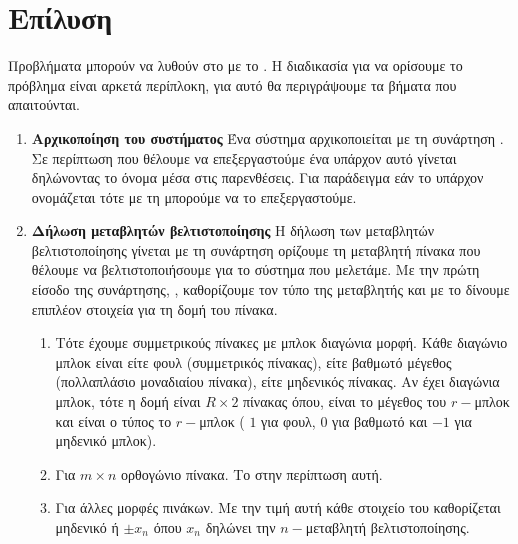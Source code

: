 \section{Επίλυση}
Προβλήματα  μπορούν να λυθούν στο  με το . Η διαδικασία για να ορίσουμε το πρόβλημα είναι αρκετά περίπλοκη, για
αυτό θα περιγράψουμε τα βήματα που απαιτούνται.
\begin{enumerate}
    \item \textbf{Αρχικοποίηση του  συστήματος} Ένα σύστημα 
        αρχικοποιείται με τη συνάρτηση . Σε περίπτωση
        που θέλουμε να επεξεργαστούμε ένα υπάρχον  αυτό γίνεται
        δηλώνοντας το όνομα μέσα στις παρενθέσεις. Για παράδειγμα εάν το υπάρχον
         ονομάζεται  τότε με τη 
        μπορούμε να το επεξεργαστούμε.
    \item \textbf{Δήλωση μεταβλητών βελτιστοποίησης} Η δήλωση των μεταβλητών
        βελτιστοποίησης γίνεται με τη συνάρτηση
         ορίζουμε τη μεταβλητή πίνακα που
        θέλουμε να βελτιστοποιήσουμε για το  σύστημα που μελετάμε. Με
        την πρώτη είσοδο της συνάρτησης, , καθορίζουμε τον
        τύπο της μεταβλητής και με το  δίνουμε επιπλέον
        στοιχεία για τη δομή του πίνακα.
        \begin{enumerate}
            \item \textbf{} Τότε έχουμε
                συμμετρικούς πίνακες με μπλοκ διαγώνια μορφή. Κάθε διαγώνιο μπλοκ είναι
                είτε φουλ (συμμετρικός πίνακας), είτε βαθμωτό μέγεθος (πολλαπλάσιο
                μοναδιαίου πίνακα), είτε μηδενικός πίνακας. Αν  έχει 
                διαγώνια μπλοκ, τότε η δομή  είναι \(R \times 2\) πίνακας
                όπου,  είναι το μέγεθος του \(r-\)μπλοκ και
                 είναι ο τύπος το \(r-\)μπλοκ ( \(1\) για φουλ, \(0\)
                για βαθμωτό και \(-1\) για μηδενικό μπλοκ).
            \item \textbf{} Για \( m \times n\) ορθογώνιο πίνακα. Το
                 στην περίπτωση αυτή.
            \item \textbf{} Για άλλες μορφές πινάκων. Με την τιμή
                αυτή κάθε στοιχείο του  καθορίζεται μηδενικό ή \( \pm
                x_n\) όπου \(x_n\) δηλώνει την \(n-\)μεταβλητή βελτιστοποίησης.

\end{enumerate}
\end{enumerate}
